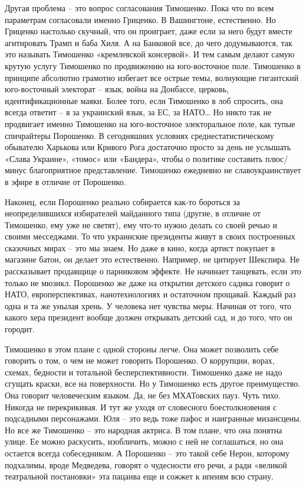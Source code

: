 Другая проблема – это вопрос согласования Тимошенко. Пока что по всем
параметрам согласовали именно Гриценко. В Вашингтоне, естественно. Но Гриценко
настолько скучный, что он проиграет, даже если за него будут вместе агитировать
Трамп и баба Хиля. А на Банковой все, до чего додумываются, так это называть
Тимошенко «кремлевской консервой». И тем самым делают самую крутую услугу
Тимошенко по продвижению на юго-восточное поле. Тимошенко в принципе абсолютно
грамотно избегает все острые темы, волнующие гигантский юго-восточный электорат
– язык, война на Донбассе, церковь, идентификационные маяки. Более того, если
Тимошенко в лоб спросить, она всегда ответит – я за украинский язык, за ЕС, за
НАТО… Но никто так не продвигает именно Тимошенко на юго-восточное
электоральное поле, как тупые спичрайтеры Порошенко. В сегодняшних условиях
среднестатистическому обывателю Харькова или Кривого Рога достаточно просто за
день не услышать «Слава Украине», «томос» или «Бандера», чтобы о политике
составить плюс/минус благоприятное представление. Тимошенко ежедневно не
славоукраинствует в эфире в отличие от Порошенко.

Наконец, если Порошенко реально собирается как-то бороться за неопределившихся
избирателей майданного типа (другие, в отличие от Тимошенко, ему уже не
светят), ему что-то нужно делать со своей речью и своими месседжами. То что
украинские президенты живут в своих построенных сказочных мирах – это мы знаем.
Но даже в кино, когда артист покупает в магазине батон, он делает это
естественно. Например, не цитирует Шекспира. Не рассказывает продавщице о
парниковом эффекте. Не начинает танцевать, если это только не мюзикл. Порошенко
же даже на открытии детского садика говорит о НАТО, европерспективах,
нанотехнологиях и остаточном прощавай. Каждый раз одна и та же унылая хрень. У
человека нет чувства меры. Начиная от того, что какого хера президент вообще
должен открывать детский сад, и до того, что он городит.

Тимошенко в этом плане с одной стороны легче. Она может позволить себе говорить
о том, о чем не может говорить Порошенко. О коррупции, ворах, схемах, бедности
и тотальной бесперспективности. Тимошенко даже не надо сгущать краски, все на
поверхности. Но у Тимошенко есть другое преимущество. Она говорит человеческим
языком. Да, не без МХАТовских пауз. Чуть тихо. Никогда не перекрикивая. И тут
же уходя от словесного боестолкновения с подсадными персонажами. Юля – это ведь
тоже пафос и наигранные мизансцены. Но все же Тимошенко – это народная актриса.
В том плане, что она понятна улице. Ее можно раскусить, изобличить, можно с ней
не соглашаться, но она остается всегда собеседником. А Порошенко – это такой
себе Нерон, которому подхалимы, вроде Медведева, говорят о чудесности его речи,
а ради «великой театральной постановки» эта пацанва еще и сожжет к ипеням всю
страну.

